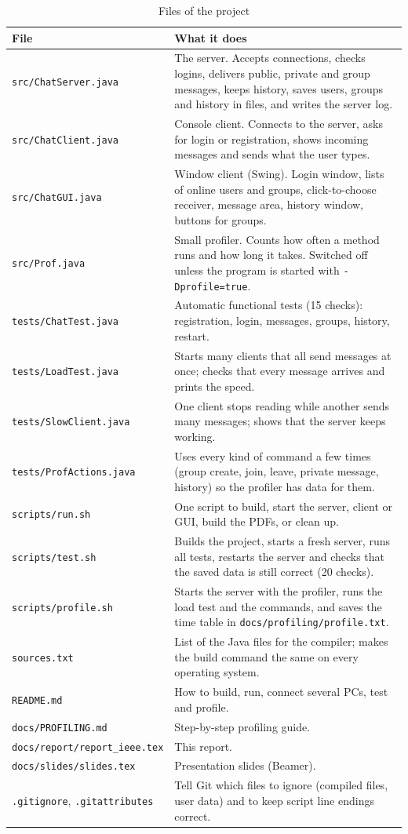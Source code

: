\documentclass[conference]{IEEEtran}
\newcommand{\code}[1]{\texttt{#1}}
\begin{document}
\begin{table}[!t]
\caption{Files of the project}
\label{tab:files}
\centering\small
\begin{tabular}{@{}p{}p{}@{}}
\toprule
File & What it does\\
\midrule
\code{src/ChatServer.java} & The server. Accepts connections, checks logins, delivers public, private and group messages, keeps history, saves users, groups and history in files, and writes the server log.\\
\code{src/ChatClient.java} & Console client. Connects to the server, asks for login or registration, shows incoming messages and sends what the user types.\\
\code{src/ChatGUI.java} & Window client (Swing). Login window, lists of online users and groups, click-to-choose receiver, message area, history window, buttons for groups.\\
\code{src/Prof.java} & Small profiler. Counts how often a method runs and how long it takes. Switched off unless the program is started with \code{-Dprofile=true}.\\
\code{tests/ChatTest.java} & Automatic functional tests (15 checks): registration, login, messages, groups, history, restart.\\
\code{tests/LoadTest.java} & Starts many clients that all send messages at once; checks that every message arrives and prints the speed.\\
\code{tests/SlowClient.java} & One client stops reading while another sends many messages; shows that the server keeps working.\\
\code{tests/ProfActions.java} & Uses every kind of command a few times (group create, join, leave, private message, history) so the profiler has data for them.\\
\code{scripts/run.sh} & One script to build, start the server, client or GUI, build the PDFs, or clean up.\\
\code{scripts/test.sh} & Builds the project, starts a fresh server, runs all tests, restarts the server and checks that the saved data is still correct (20 checks).\\
\code{scripts/profile.sh} & Starts the server with the profiler, runs the load test and the commands, and saves the time table in \code{docs/profiling/profile.txt}.\\
\code{sources.txt} & List of the Java files for the compiler; makes the build command the same on every operating system.\\
\code{README.md} & How to build, run, connect several PCs, test and profile.\\
\code{docs/PROFILING.md} & Step-by-step profiling guide.\\
\code{docs/report/report\_ieee.tex} & This report.\\
\code{docs/slides/slides.tex} & Presentation slides (Beamer).\\
\code{.gitignore}, \code{.gitattributes} & Tell Git which files to ignore (compiled files, user data) and to keep script line endings correct.\\
\bottomrule
\end{tabular}
\end{table}
\end{document}
